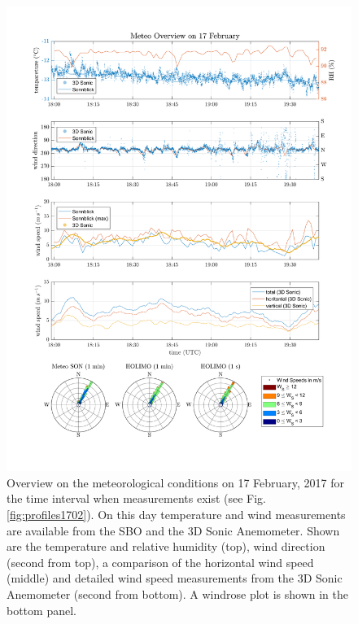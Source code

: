 \documentclass[draft,linenumbers]{agujournal}
\begin{document}
\begin{figure}[t]
 \centering
 	\includegraphics[width=14cm]{MeteoOverview_1702.png}
 \caption{Overview on the meteorological conditions on 17 February, 2017 for the time interval when measurements exist (see Fig. \ref{fig:profiles1702}). On this day temperature and wind measurements are available from the SBO and the 3D Sonic Anemometer. Shown are the temperature and relative humidity (top), wind direction (second from top), a comparison of the horizontal wind speed (middle) and detailed wind speed measurements from the 3D Sonic Anemometer (second from bottom). A windrose plot is shown in the bottom panel.}
 \label{fig:meteo1702}
\end{figure}
\end{document}

